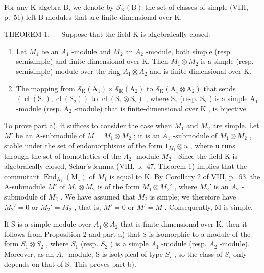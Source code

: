 For any K-algebra B, we denote by \(\mathcal{S}_{\mathrm{K}}(\mathrm{B})\) the set of classes of simple (VIII, p.~51) left B-modules that are finite-dimensional over K.

THEOREM 1. --- Suppose that the field K is algebraically closed.

\begin{enumerate}
\def\labelenumi{\alph{enumi})}
\item
  Let \(M_{1}\) be an \(A_{1}\) -module and \(M_{2}\) an \(A_{2}\) -module, both simple (resp. semisimple) and finite-dimensional over K. Then \(M_{1} \otimes M_{2}\) is a simple (resp. semisimple) module over the ring \(A_{1} \otimes A_{2}\) and is finite-dimensional over K.
\item
  The mapping from \(\mathcal{S}_{\mathrm{K}}(\mathrm{A}_1)\times \mathcal{S}_{\mathrm{K}}(\mathrm{A}_2)\) to \(\mathcal{S}_{\mathrm{K}}(\mathrm{A}_1\otimes \mathrm{A}_2)\) that sends \((\operatorname {cl}(\mathrm{S}_1),\operatorname {cl}(\mathrm{S}_2))\) to \(\operatorname {cl}(\mathrm{S}_1\otimes \mathrm{S}_2)\) , where \(\mathrm{S}_1\) (resp. \(\mathrm{S}_2\) ) is a simple \(\mathrm{A}_1\) -module (resp. \(\mathrm{A}_2\) -module) that is finite-dimensional over \(\mathrm{K}\) , is bijective.
\end{enumerate}

To prove part a), it suffices to consider the case when \(M_{1}\) and \(M_{2}\) are simple. Let \(M'\) be an A-submodule of \(M = M_{1} \otimes M_{2}\) ; it is an \(A_{1}\) -submodule of \(M_{1} \otimes M_{2}\) , stable under the set of endomorphisms of the form \(1_{M_{1}} \otimes u\) , where u runs through the set of homotheties of the \(A_{2}\) -module \(M_{2}\) . Since the field K is algebraically closed, Schur's lemma (VIII, p.~47, Theorem 1) implies that the commutant \(\operatorname{End}_{\mathrm{A}_{1}}(\mathrm{M}_{1})\) of \(M_{1}\) is equal to K. By Corollary 2 of VIII, p.~63, the A-submodule \(M'\) of \(M_{1} \otimes M_{2}\) is of the form \(M_{1} \otimes M_{2}'\) , where \(M_{2}'\) is an \(A_{2}\) -submodule of \(M_{2}\) . We have assumed that \(M_{2}\) is simple; we therefore have \(M_{2}' = 0\) or \(M_{2}' = M_{2}\) , that is, \(M' = 0\) or \(M' = M\) . Consequently, M is simple.

If S is a simple module over \(A_{1} \otimes A_{2}\) that is finite-dimensional over K, then it follows from Proposition 2 and part a) that S is isomorphic to a module of the form \(S_{1} \otimes S_{2}\) , where \(S_{1}\) (resp. \(S_{2}\) ) is a simple \(A_{1}\) -module (resp. \(A_{2}\) -module). Moreover, as an \(A_{i}\) -module, S is isotypical of type \(S_{i}\) , so the class of \(S_{i}\) only depends on that of S. This proves part b).


